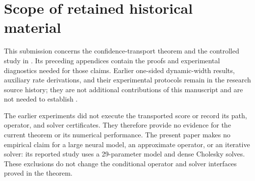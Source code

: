 \section{Scope of retained historical material}\label{app:legacy-evidence}
This submission concerns the confidence-transport theorem and the controlled
study in .  Its preceding appendices contain
the proofs and experimental diagnostics needed for those claims.  Earlier
one-sided dynamic-width results, auxiliary rate derivations, and their
experimental protocols remain in the research source history; they are not
additional contributions of this manuscript and are not needed to establish
.

The earlier experiments did not execute the transported score or record its
path, operator, and solver certificates.  They therefore provide no evidence
for the current theorem or its numerical performance.  The present paper
makes no empirical claim for a large neural model, an approximate operator,
or an iterative solver: its reported study uses a 29-parameter model and
dense Cholesky solves.  These exclusions do not change the conditional
operator and solver interfaces proved in the theorem.
